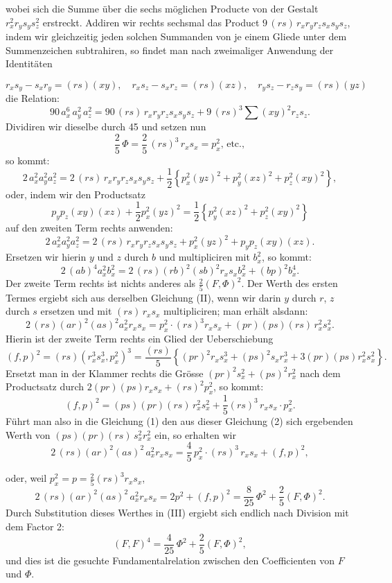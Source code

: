\documentclass[11pt]{article}
\providecommand{\weberpage}[1]{}
\providecommand{\weq}[2]{\begin{equation}\tag{#1}#2\end{equation}}
\let\Phi\varPhi
\begin{document}
\weberpage{297}
wobei sich die Summe über die sechs möglichen Producte von der Gestalt $r_x^2 r_y s_y s_z^2$ erstreckt. Addiren wir rechts sechsmal das Product $9\,(rs)\,r_x r_y r_z s_x s_y s_z$, indem wir gleichzeitig jeden solchen Summanden von je einem Gliede unter dem Summenzeichen subtrahiren, so findet man nach zweimaliger Anwendung der Identitäten

\[
r_x s_y - s_x r_y = (rs)(xy), \quad r_x s_z - s_x r_z = (rs)(xz), \quad r_y s_z - r_z s_y = (rs)(yz)
\]
die Relation:
\[
90\,a_x^6\,a_y^2\,a_z^2 = 90\,(rs)\,r_x r_y r_z s_x s_y s_z + 9\,(rs)^3 \sum (xy)^2 r_z s_z.
\]
Dividiren wir dieselbe durch 45 und setzen nun
\[
\frac{2}{5}\,\Phi = \frac{2}{5}\,(rs)^3\,r_x s_x = p_x^2\text{, etc.},
\]
so kommt:
\[
2\,a_x^2 a_y^2 a_z^2 = 2\,(rs)\,r_x r_y r_z s_x s_y s_z + \frac{1}{2}\left\{ p_x^2 (yz)^2 + p_y^2 (xz)^2 + p_z^2 (xy)^2 \right\},
\]
oder, indem wir den Productsatz
\[
p_y p_z (xy)(xz) + \frac{1}{2} p_x^2 (yz)^2 = \frac{1}{2}\left\{ p_y^2(xz)^2 + p_z^2(xy)^2 \right\}
\]
auf den zweiten Term rechts anwenden:
\weq{II}{
2\,a_x^2 a_y^2 a_z^2 = 2\,(rs)\,r_x r_y r_z s_x s_y s_z + p_x^2 (yz)^2 + p_y p_z (xy)(xz).
}
Ersetzen wir hierin $y$ und $z$ durch $b$ und multipliciren mit $b_x^2$, so kommt:
\weq{III}{
2\,(ab)^4 a_x^2 b_x^2 = 2\,(rs)(rb)^2(sb)^2 r_x s_x b_x^2 + (bp)^2 b_x^4.
}
Der zweite Term rechts ist nichts anderes als $\frac{2}{5}(F,\Phi)^2$. Der Werth des ersten Termes ergiebt sich aus derselben Gleichung (II), wenn wir darin $y$ durch $r$, $z$ durch $s$ ersetzen und mit $(rs)\,r_x s_x$ multipliciren; man erhält alsdann:
\weq{1}{
2\,(rs)(ar)^2(as)^2 a_x^2 r_x s_x = p_x^2\cdot(rs)^3 r_x s_x + (pr)(ps)(rs)\,r_x^2 s_x^2.
}
Hierin ist der zweite Term rechts ein Glied der Ueberschiebung
\[
(f,p)^2 = (rs)(r_x^3 s_x^3, p_x^2)^3 = \frac{(rs)}{5}\left\{ (pr)^2 r_x s_x^3 + (ps)^2 s_x r_x^3 + 3(pr)(ps) r_x^2 s_x^2 \right\}.
\]
Ersetzt man in der Klammer rechts die Grösse $(pr)^2 s_x^2 + (ps)^2 r_x^2$ nach dem Productsatz durch $2(pr)(ps) r_x s_x + (rs)^2 p_x^2$, so kommt:
\weq{2}{
(f,p)^2 = (ps)(pr)(rs)\,r_x^2 s_x^2 + \frac{1}{5}(rs)^3\,r_x s_x\cdot p_x^2.
}
Führt man also in die Gleichung (1) den aus dieser Gleichung (2) sich ergebenden Werth von $(ps)(pr)(rs)\,s_x^2 r_x^2$ ein, so erhalten wir
\[
2\,(rs)(ar)^2(as)^2\,a_x^2 r_x s_x = \frac{4}{5}\,p_x^2\cdot(rs)^3\,r_x s_x + (f,p)^2,
\]


\weberpage{298}
oder, weil $p_x^2 = p = \frac{2}{5}(rs)^3 r_x s_x$,
\[
2\,(rs)(ar)^2(as)^2\,a_x^2 r_x s_x = 2p^2 + (f,p)^2 = \frac{8}{25}\,\Phi^2 + \frac{2}{5}(F,\Phi)^2.
\]
Durch Substitution dieses Werthes in (III) ergiebt sich endlich nach Division mit dem Factor 2:
\weq{IV}{
(F,F)^4 = \frac{4}{25}\,\Phi^2 + \frac{2}{5}(F,\Phi)^2,
}
und dies ist die gesuchte Fundamentalrelation zwischen den Coefficienten von $F$ und $\Phi$.
\end{document}
